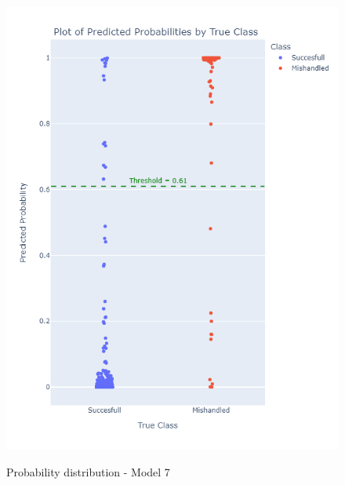 \documentclass[12pt]{article}
\begin{document}
\begin{figure}
\begin{minipage}[c]{0.4\linewidth}
    \includegraphics[width=1\textwidth]{Probability_distribution_Model 7.png}\\
    \caption{Probability distribution - Model 7}
\end{minipage}
\end{figure}
\end{document}
